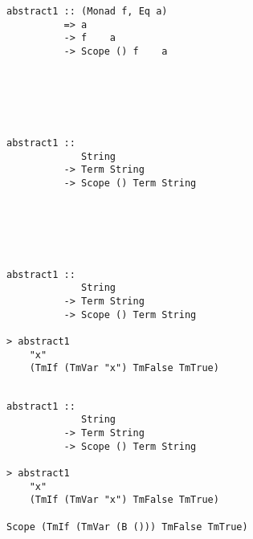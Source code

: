 \documentclass[aspectration=169]{beamer}
\begin{document}
\begin{frame}[fragile]
  \begin{overprint}
  \begin{verbatim}
abstract1 :: (Monad f, Eq a) 
          => a 
          -> f    a 
          -> Scope () f    a






  \end{verbatim}  
  \begin{verbatim}
abstract1 :: 
             String 
          -> Term String 
          -> Scope () Term String






  \end{verbatim}  
  \begin{verbatim}
abstract1 :: 
             String 
          -> Term String 
          -> Scope () Term String

> abstract1 
    "x" 
    (TmIf (TmVar "x") TmFalse TmTrue)


  \end{verbatim}  
  \begin{verbatim}
abstract1 :: 
             String 
          -> Term String 
          -> Scope () Term String

> abstract1 
    "x" 
    (TmIf (TmVar "x") TmFalse TmTrue)

Scope (TmIf (TmVar (B ())) TmFalse TmTrue) 
  \end{verbatim}  
  \end{overprint}
\end{frame}
\end{document}
